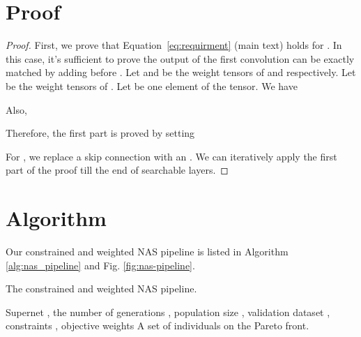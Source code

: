 \documentclass[runningheads]{llncs}
\begin{document}
\section{Proof}\label{sec:app-proof}

\begin{proof}


	First, we prove that Equation~\ref{eq:requirment} (main text) holds for . In this case, it's sufficient to prove the output of the first convolution  can be exactly matched by adding  before .
	Let  and  be the weight tensors of  and  respectively. Let  be the weight tensors of . Let  be one element of the tensor. We have
	

	Also,
	
Therefore, the first part is proved by setting
		
	For , we replace a skip connection with an . We can iteratively apply the first part of the proof till the end of searchable layers. 
\end{proof}


\section{Algorithm} \label{sec:app-alg}

Our constrained and weighted NAS pipeline is listed in Algorithm \ref{alg:nas_pipeline} and Fig. \ref{fig:nas-pipeline}.

\begin{algorithm}[tb]
	\caption{The constrained and weighted NAS pipeline.}
	\label{alg:nas_pipeline}
	\begin{algorithmic}
		 Supernet , the number of generations , population size , validation dataset , constraints , objective weights 
		 A set of  individuals on the Pareto front.
		
		\STATE{}
		\STATE {}
		\STATE {}
		\WHILE {}
		
		
		\STATE {}
		
		
		\STATE { }
		\IF {}
		\ENDIF
		\IF {}
		\ENDIF
		
		
\ENDWHILE
		
		\ENDFOR
	\end{algorithmic}
\end{algorithm}
\end{document}
